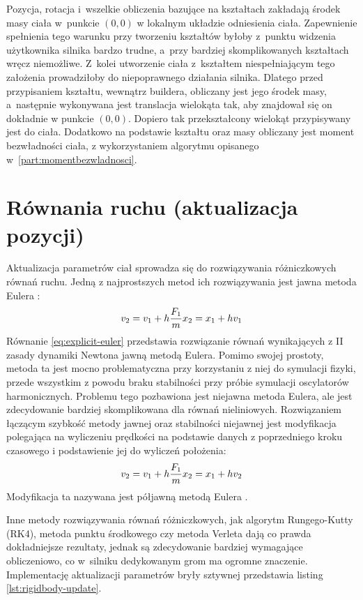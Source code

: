 Pozycja, rotacja i~wszelkie obliczenia bazujące na kształtach zakładają środek masy ciała w~punkcie $(0,0)$ w lokalnym układzie odniesienia ciała. Zapewnienie spełnienia tego warunku przy tworzeniu kształtów byłoby z~punktu widzenia użytkownika silnika bardzo trudne, a~przy bardziej skomplikowanych kształtach wręcz niemożliwe. Z~kolei utworzenie ciała z~kształtem niespełniającym tego założenia prowadziłoby do niepoprawnego działania silnika. Dlatego przed przypisaniem kształtu, wewnątrz buildera, obliczany jest jego środek masy, a~następnie wykonywana jest translacja wielokąta tak, aby znajdował się on dokładnie w punkcie $(0,0)$. Dopiero tak przekształcony wielokąt przypisywany jest do ciała. Dodatkowo na podstawie kształtu oraz masy obliczany jest moment bezwładności ciała, z wykorzystaniem algorytmu opisanego w~\ref{part:momentbezwladnosci}. 

\section{Równania ruchu (aktualizacja pozycji)}
\label{part:rownaniaruchu}
Aktualizacja parametrów ciał sprowadza się do rozwiązywania różniczkowych równań ruchu. Jedną z najprostszych metod ich rozwiązywania jest jawna metoda Eulera \cite{bib:catto-semiimplicit}:
	\begin{equation}
	\label{eq:explicit-euler}
	v_2=v_1+h\frac{F_1}{m}\newline
	x_2=x_1+hv_1
	\end{equation}
Równanie \ref{eq:explicit-euler} przedstawia rozwiązanie równań wynikających z II zasady dynamiki Newtona jawną metodą Eulera. Pomimo swojej prostoty, metoda ta jest mocno problematyczna przy korzystaniu z niej do symulacji fizyki, przede wszystkim z powodu braku stabilności przy próbie symulacji oscylatorów harmonicznych. Problemu tego pozbawiona jest niejawna metoda Eulera, ale jest zdecydowanie bardziej skomplikowana dla równań nieliniowych. Rozwiązaniem łączącym szybkość metody jawnej oraz stabilności niejawnej jest modyfikacja polegająca na wyliczeniu prędkości na podstawie danych z poprzedniego kroku czasowego i podstawienie jej do wyliczeń położenia:
	\begin{equation}
	\label{eq:semiexplicit-euler}
	v_2=v_1+h\frac{F_1}{m}\newline
	x_2=x_1+hv_2
	\end{equation}
Modyfikacja ta nazywana jest półjawną metodą Eulera \cite{bib:catto-semiimplicit}.

Inne metody rozwiązywania równań różniczkowych, jak algorytm Rungego-Kutty (RK4), metoda punktu środkowego czy metoda Verleta dają co prawda dokładniejsze rezultaty, jednak są zdecydowanie bardziej wymagające obliczeniowo, co w~silniku dedykowanym grom ma ogromne znaczenie. Implementację aktualizacji parametrów bryły sztywnej przedstawia listing \ref{lst:rigidbody-update}.


